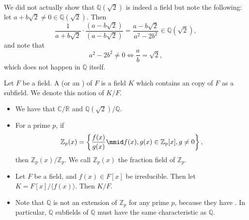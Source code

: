 \documentclass[notoc,notitlepage,nobib]{tufte-book}
\begin{document}
\begin{note}
  We did not actually show that $\mathbb{Q}(\sqrt{2})$ is indeed a field but note the following:
  let $a + b \sqrt{2} \neq 0 \in \mathbb{Q}(\sqrt{2})$. Then
  \begin{equation*}
    \frac{1}{a + b\sqrt{2}} \cdot \frac{(a - b\sqrt{2})}{(a - b \sqrt{2})} = \frac{a - b \sqrt{2}}{a^2 - 2b^2} \in \mathbb{Q}(\sqrt{2}),
  \end{equation*}
  and note that
  \begin{equation*}
    a^2 - 2b^2 \neq 0 \iff \frac{a}{b} = \sqrt{2},
  \end{equation*}
  which does not happen in $\mathbb{Q}$ itself.
\end{note}

\begin{defn}\label{defn:field_extension}
  Let $F$ be a field. A  (or an ) of $F$ is a field $K$
  which contains an  copy of $F$ as a subfield. We denote this notion of $K/F$.
\end{defn}

\begin{eg}
  \begin{itemize}
    \item We have that $\mathbb{C} / \mathbb{R}$ and $\mathbb{Q}(\sqrt{2}) / \mathbb{Q}$.

    \item For a prime $p$, if
      \begin{equation*}
        \mathbb{Z}_p(x) = \left\{ \frac{f(x)}{g(x)} \mmid f(x), g(x) \in
          \mathbb{Z}_p[x], g \neq 0 \right\},
      \end{equation*}
      then $\mathbb{Z}_p(x) / \mathbb{Z}_p$. We call $\mathbb{Z}_p(x)$ the
      fraction field of $\mathbb{Z}_p$.

    \item Let $F$ be a field, and $f(x) \in F[x]$ be irreducible. Then let $K =
      F[x]/\langle f(x) \rangle$. Then $K / F$.

    \item Note that $\mathbb{Q}$ is not an extension of $\mathbb{Z}_p$ for any
      prime $p$, because they have . In
      particular, $\mathbb{Q}$ subfields of $\mathbb{Q}$ must have the same
      characteristic as $\mathbb{Q}$.
  \end{itemize}
\end{eg}
\end{document}
